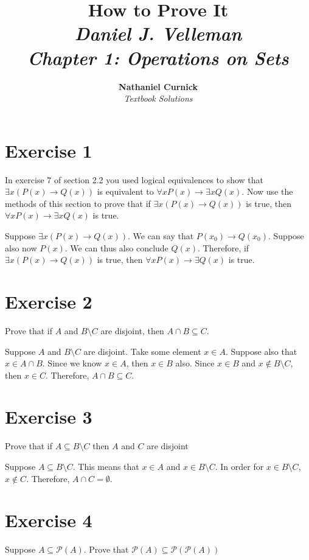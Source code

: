\documentclass[11pt]{article}
\title{\textbf{How to Prove It} \\ {\Large\itshape Daniel J. Velleman} \\ {\Large\itshape Chapter 1: Operations on Sets}}
\author{\textbf{Nathaniel Curnick} \\ \textit{Textbook Solutions}}
\date{}
\newcommand{\then}{\rightarrow}
\newcommand{\powerset}[1]{\mathscr{P}(#1)}
\begin{document}
\maketitle

\section*{Exercise 1}

In exercise 7 of section 2.2  you used logical equivalences to show that 
$\exists x (P(x) \then Q(x))$ is equivalent to 
$\forall x P(x) \then \exists x Q(x)$. Now use the methods of this section 
to prove that if $\exists x (P(x) \then Q(x))$ is true, then 
$\forall x P(x) \then \exists x Q(x)$ is true.

Suppose $\exists x (P(x) \then Q(x))$. We can say that $P(x_0) \then Q(x_0)$.
Suppose also now $P(x)$. We can thus also conclude $Q(x)$. Therefore, if 
$\exists x (P(x) \then Q(x))$ is true, then $\forall x P(x) \then \exists Q(x)$ 
is true.

\section*{Exercise 2}

Prove that if $A$ and $B \setminus C$ are disjoint, then $A \cap B \subseteq C$.

Suppose $A$ and $B \setminus C$ are disjoint. Take some element $x \in A$. 
Suppose also that $x \in A \cap B$. Since we know $x \in A$, then $x \in B$ also.
Since $x \in B$ and $x \notin B \setminus C$, then $x \in C$. Therefore, 
$A \cap B \subseteq C$.

\section*{Exercise 3}

Prove that if $A \subseteq B \setminus C$ then $A$ and $C$ are disjoint

Suppose $A \subseteq B \setminus C$. This means that $x \in A$ and 
$x \in B \setminus C$. In order for $x \in B \setminus C$, $x \notin C$. 
Therefore, $A \cap C = \emptyset$.

\section*{Exercise 4}

Suppose $A \subseteq \powerset{A}$. Prove that 
$\powerset{A} \subseteq \powerset{\powerset{A}}$
\end{document}
